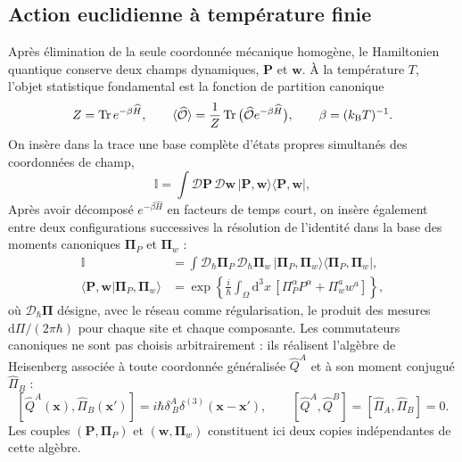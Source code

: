 \subsection{Action euclidienne à température finie}

Après élimination de la seule coordonnée mécanique homogène, le Hamiltonien
quantique conserve deux champs dynamiques, $\mathbf P$ et $\mathbf w$. À la
température $T$, l'objet statistique fondamental est la fonction de partition
canonique
\begin{equation}
Z=\operatorname{Tr}e^{-\beta\widehat H},
\qquad
\langle\widehat{\mathcal O}\rangle
=\frac{1}{Z}\operatorname{Tr}
\big(\widehat{\mathcal O}e^{-\beta\widehat H}\big),
\qquad \beta=(k_{\rm B}T)^{-1}.
\label{eq:core_partition_trace}
\end{equation}
On insère dans la trace une base complète d'états propres simultanés des
coordonnées de champ,
\begin{equation}
\mathbb I=\int\mathcal D\mathbf P\,\mathcal D\mathbf w\,
|\mathbf P,\mathbf w\rangle\langle\mathbf P,\mathbf w|,
\label{eq:core_field_resolution_identity}
\end{equation}
Après avoir décomposé $e^{-\beta\widehat H}$ en facteurs de temps court, on
insère également entre deux configurations successives la résolution de
l'identité dans la base des moments canoniques
$\boldsymbol\Pi_P$ et $\boldsymbol\Pi_w$ :
\begin{equation}
\begin{aligned}
\mathbb I
&=\int\mathcal D_\hbar\boldsymbol\Pi_P\,
\mathcal D_\hbar\boldsymbol\Pi_w\,
|\boldsymbol\Pi_P,\boldsymbol\Pi_w\rangle
\langle\boldsymbol\Pi_P,\boldsymbol\Pi_w|,\\
\langle\mathbf P,\mathbf w
|\boldsymbol\Pi_P,\boldsymbol\Pi_w\rangle
&=\exp\!\left\{\frac{i}{\hbar}\int_\Omega\!\mathrm d^3x\,
\left[\Pi_P^\alpha P^\alpha+\Pi_w^a w^a\right]\right\},
\end{aligned}
\label{eq:core_momentum_resolution_identity}
\end{equation}
où $\mathcal D_\hbar\boldsymbol\Pi$ désigne, avec le réseau comme
régularisation, le produit des mesures
$\mathrm d\Pi/(2\pi\hbar)$ pour chaque site et chaque composante. Les
commutateurs canoniques ne sont pas choisis arbitrairement : ils réalisent
l'algèbre de Heisenberg associée à toute coordonnée généralisée
$\widehat Q^A$ et à son moment conjugué $\widehat\Pi_B$ :
\[
[\widehat Q^A(\mathbf x),\widehat\Pi_B(\mathbf x')]
=i\hbar\delta^A_{\ B}\delta^{(3)}(\mathbf x-\mathbf x'),
\qquad
[\widehat Q^A,\widehat Q^B]=
[\widehat\Pi_A,\widehat\Pi_B]=0.
\]
Les couples $(\mathbf P,\boldsymbol\Pi_P)$ et
$(\mathbf w,\boldsymbol\Pi_w)$ constituent ici deux copies indépendantes de
cette algèbre.

